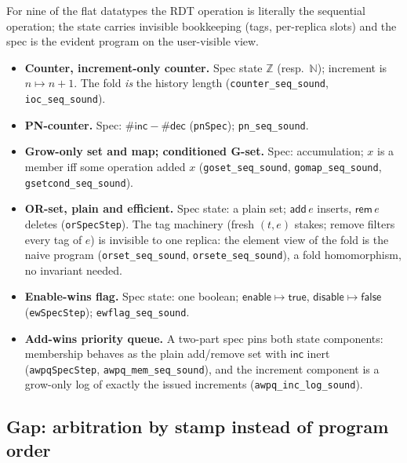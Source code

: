 \documentclass[11pt]{article}
\newcommand{\code}[1]{\texttt{#1}}
\begin{document}
For nine of the flat datatypes the RDT operation is literally the
sequential operation; the state carries invisible bookkeeping (tags,
per-replica slots) and the spec is the evident program on the
user-visible view.

\begin{itemize}
\item \textbf{Counter, increment-only counter.} Spec state
  $\mathbb{Z}$ (resp.\ $\mathbb{N}$); increment is $n \mapsto n + 1$.
  The fold \emph{is} the history length
  (\code{counter\_seq\_sound}, \code{ioc\_seq\_sound}).
\item \textbf{PN-counter.} Spec: $\#\mathsf{inc} - \#\mathsf{dec}$
  (\code{pnSpec}); \code{pn\_seq\_sound}.
\item \textbf{Grow-only set and map; conditioned G-set.} Spec:
  accumulation; $x$ is a member iff some operation added $x$
  (\code{goset\_seq\_sound}, \code{gomap\_seq\_sound},
  \code{gsetcond\_seq\_sound}).
\item \textbf{OR-set, plain and efficient.} Spec state: a plain set;
  $\mathsf{add}\,e$ inserts, $\mathsf{rem}\,e$ deletes
  (\code{orSpecStep}). The tag machinery (fresh $(t, e)$ stakes;
  remove filters every tag of $e$) is invisible to one replica: the
  element view of the fold is the naive program
  (\code{orset\_seq\_sound}, \code{orsete\_seq\_sound}), a fold
  homomorphism, no invariant needed.
\item \textbf{Enable-wins flag.} Spec state: one boolean;
  $\mathsf{enable} \mapsto \mathsf{true}$,
  $\mathsf{disable} \mapsto \mathsf{false}$ (\code{ewSpecStep});
  \code{ewflag\_seq\_sound}.
\item \textbf{Add-wins priority queue.} A two-part spec pins both
  state components: membership behaves as the plain add/remove set
  with $\mathsf{inc}$ inert (\code{awpqSpecStep},
  \code{awpq\_mem\_seq\_sound}), and the increment component is a
  grow-only log of exactly the issued increments
  (\code{awpq\_inc\_log\_sound}).
\end{itemize}

\subsection{Gap: arbitration by stamp instead of program order}
\end{document}
